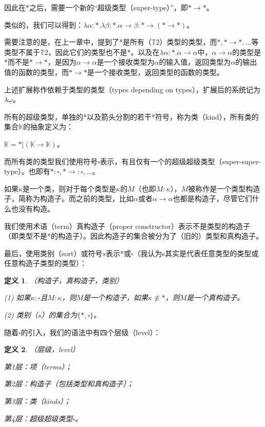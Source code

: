 \documentclass[UTF8]{article}
\newtheorem{thm}{定义}[section]
\begin{document}
		因此在*之后，需要一个新的“超级类型（super-type）”，即$*\rightarrow*$。
		
		类似的，我们可以得到：$\lambda\alpha:*.\lambda\beta:*.\alpha\rightarrow\beta:*\rightarrow(*\rightarrow*)$。
		
		需要注意的是，在上一章中，提到了*是所有（$\mathbb{T}2$）类型的类型，而$*,*\rightarrow*,...$等类型不属于$\mathbb{T}2$，因此它们的类型也不是*。以及在$\lambda\alpha:*.\alpha\rightarrow\alpha$中，$\alpha\rightarrow\alpha$的类型是*而不是$*\rightarrow*$，是因为$\alpha\rightarrow\alpha$是一个接收类型为$\alpha$的输入值，返回类型为$\alpha$的输出值的函数的类型，而$*\rightarrow*$是一个接收类型，返回类型的函数的类型。
		
		上述扩展称作依赖于类型的类型（types depending on types），扩展后的系统记为$\lambda{\underline{\omega}}$。
			
		所有的超级类型，单独的*以及箭头分割的若干*符号，称为类（kind），所有类的集合$\mathbb{K}$的抽象定义为：
		
		$\mathbb{K}=*|(\mathbb{K}\rightarrow\mathbb{K})$。
		
		而所有类的类型我们使用符号$\square$表示，有且仅有一个的超级超级类型（super-super-type）。也即有$*:\square,*\rightarrow:\square,...$。
		
		如果$\kappa$是一个类，则对于每个类型是$\kappa$的$M$（也即$M:\kappa$），$M$被称作是一个类型构造子，简称为构造子。而之前的类型，比如$\alpha$或者$\alpha\rightarrow\alpha$也都是构造子，尽管它们什么也没有构造。
		
		我们使用术语（term）真构造子（proper constructor）表示不是类型的构造子（即类型不是*的构造子）。因此构造子的集合被分为了（旧的）类型和真构造子。
		
		最后，使用类别（sort）或符号$s$表示*或$\square$（我认为s其实是代表任意类型的类型或任意构造子类型的类型）：
		
		\begin{thm}（构造子，真构造子，类别）
			
			(1) 如果$\kappa:\square$且$M:\kappa$，则$M$是一个构造子，如果$\kappa\not\equiv*$，则$M$是一个真构造子。
			
			(2) 类别（$s$）的集合为$\{*,\square\}$。
		\end{thm}
	
		随着$\square$的引入，我们的语法中有四个层级（level）：
		
		\begin{thm}（层级，level）
			
			第1层：项（terms）；
			
			第2层：构造子（包括类型和真构造子）；
			
			第3层：类（kinds）；
			
			第4层：超级超级类型$\square$。
		\end{thm}
	
\end{document}
